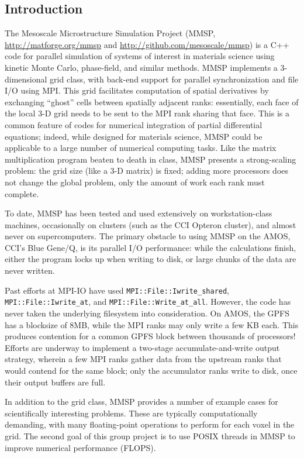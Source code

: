 \documentclass[11pt]{article}
\begin{document}
\begin{multicols}{2}
\subsection*{Introduction}
The Mesoscale Microstructure Simulation Project (MMSP, \url{http://matforge.org/mmsp} and \url{http://github.com/mesoscale/mmsp}) is a C++ code for parallel simulation of systems of interest in materials science using kinetic Monte Carlo, phase-field, and similar methods.
MMSP implements a 3-dimensional grid class, with back-end support for parallel synchronization and file I/O using MPI.
This grid facilitates computation of spatial derivatives by exchanging ``ghost'' cells between spatially adjacent ranks:
essentially, each face of the local 3-D grid needs to be sent to the MPI rank sharing that face.
This is a common feature of codes for numerical integration of partial differential equations;
indeed, while designed for materials science, MMSP could be applicable to a large number of numerical computing tasks.
Like the matrix multiplication program beaten to death in class, MMSP presents a strong-scaling problem:
the grid size (like a 3-D matrix) is fixed; adding more processors does not change the global problem, only the amount of work each rank must complete.

To date, MMSP has been tested and used extensively on workstation-class machines, occasionally on clusters (such as the CCI Opteron cluster), and almost never on supercomputers.
The primary obstacle to using MMSP on the AMOS, CCI's Blue Gene/Q, is its parallel I/O performance:
while the calculations finish, either the program locks up when writing to disk, or large chunks of the data are never written.

Past efforts at MPI-IO have used \texttt{MPI::File::Iwrite\_shared}, \texttt{MPI::File::Iwrite\_at}, and \texttt{MPI::File::Write\_at\_all}.
However, the code has never taken the underlying filesystem into consideration.
On AMOS, the GPFS has a blocksize of 8MB, while the MPI ranks may only write a few KB each.
This produces contention for a common GPFS block between thousands of processors!
Efforts are underway to implement a two-stage accumulate-and-write output strategy, wherein a few MPI ranks gather data from the upstream ranks that would contend for the same block;
only the accumulator ranks write to disk, once their output buffers are full.

In addition to the grid class, MMSP provides a number of example cases for scientifically interesting problems.
These are typically computationally demanding, with many floating-point operations to perform for each voxel in the grid.
The second goal of this group project is to use POSIX threads in MMSP to improve numerical performance (FLOPS).


\end{multicols}
\end{document}
